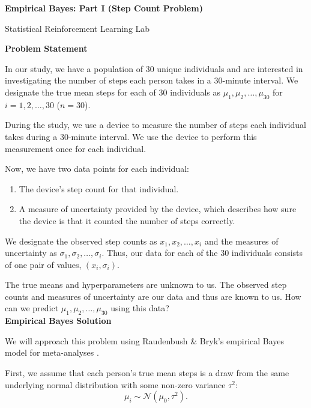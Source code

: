 \documentclass[letterpaper, 11pt]{extarticle}
\begin{document}
\pagestyle{fancy}
\fancyhf{}
\begin{Large}
    \textsf{\textbf{Empirical Bayes: Part I (Step Count Problem)}}   \par
    Statistical Reinforcement Learning Lab
\end{Large}

\vspace{2ex}

\textsf{\textbf{Problem Statement}}

In our study, we have a population of 30 unique individuals and are interested in investigating the number of steps each person takes in a 30-minute interval. We designate the true mean steps for each of 30 individuals as $\mu_1, \mu_2, \dots, \mu_{30}$ for $i=1, 2,\dots, 30$  ($n=30$). 

During the study, we use a device to measure the number of steps each individual takes during a 30-minute interval. We use the device to perform this measurement once for each individual. 

Now, we have two data points for each individual:\begin{enumerate}
\itemsep0em 
    \item The device's step count for that individual.
    \item A measure of uncertainty provided by the device, which describes how sure the device is that it counted the number of steps correctly.
\end{enumerate}
We designate the observed step counts as $x_1, x_2, \dots, x_i$ and the measures of uncertainty as $\sigma_1, \sigma_2, \dots, \sigma_i$. Thus, our data for each of the 30 individuals consists of one pair of values, $(x_i, \sigma_i)$. 

The true means and hyperparameters are unknown to us. The observed step counts and measures of uncertainty are our data and thus are known to us. How can we predict $\mu_1, \mu_2, \dots, \mu_{30}$ using this data?
\\

\textsf{\textbf{Empirical Bayes Solution}}

We will approach this problem using Raudenbush \& Bryk's empirical Bayes model for meta-analyses \cite{doi:10.3102/10769986010002075}. 

First, we assume that each person's true mean steps is a draw from the same underlying normal distribution with some non-zero variance $\tau^2$: $$\mu_i \sim \mathcal{N}(\mu_0, \tau^2).$$ 
\end{document}

